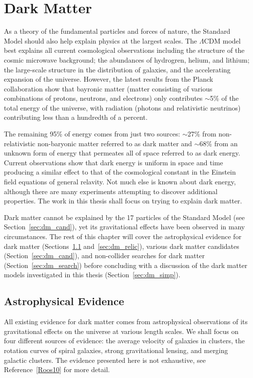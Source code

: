 \chapter{Dark Matter}
\label{sec:dm}

As a theory of the fundamental particles and forces of nature, the Standard Model should also help explain physics at the largest scales.
The $\Lambda$CDM model best explains all current cosmological observations including the structure of the cosmic microwave background; the abundances of hydrogren, helium, and lithium; the large-scale structure in the distribution of galaxies, and the accelerating expansion of the universe.
However, the latest results from the Planck collaboration show that bayronic matter (matter consisting of various combinations of protons, neutrons, and electrons) only contributes $\sim$5\% of the total energy of the universe, with radiation (photons and relativistic neutrinos) contributing less than a hundredth of a percent.

The remaining 95\% of energy comes from just two sources: $\sim$27\% from non-relativistic non-baryonic matter referred to as dark matter and $\sim$68\% from an unknown form of energy that permeates all of space referred to as dark energy.
Current observations show that dark energy is uniform in space and time producing a similar effect to that of the cosmological constant in the Einstein field equations of general relavity.
Not much else is known about dark energy, although there are many experiments attempting to discover additional properties.
The work in this thesis shall focus on trying to explain dark matter.

Dark matter cannot be explained by the 17 particles of the Standard Model (see Section~\ref{sec:dm_cand}), yet its gravitational effects have been observed in many circumstances.
The rest of this chapter will cover the astrophysical evidence for dark matter (Sections~\ref{sec:dm_astro} and~\ref{sec:dm_relic}), various dark matter candidates (Section~\ref{sec:dm_cand}), and non-collider searches for dark matter (Section~\ref{sec:dm_search}) before concluding with a discussion of the dark matter models investigated in this thesis (Section~\ref{sec:dm_simp}).

\section{Astrophysical Evidence}
\label{sec:dm_astro}

All existing evidence for dark matter comes from astrophysical observations of its gravitational effects on the universe at various length scales.
We shall focus on four different sources of evidence: the average velocity of galaxies in clusters, the rotation curves of spiral galaxies, strong gravitational lensing, and merging galactic clusters. The evidence presented here is not exhaustive, see Reference~\ref{Roos10} for more detail. %

